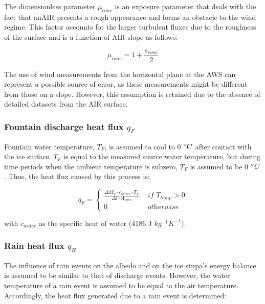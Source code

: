 The dimensionless parameter $\mu_{cone}$ is an exposure parameter that deals with the fact that an\ac{AIR} presents a rough
appearance and forms an obstacle to the wind regime. This factor accounts for the larger turbulent fluxes due to
the roughness of the surface \citep{oerlemansBriefCommunicationGrowth2021} and is a function of \ac{AIR} slope
as follows:

\begin{equation}
	\mu_{cone} = 1 + \frac{s_{cone}}{2}
	\label{eqn:mu}
\end{equation}

The use of wind measurements from the horizontal plane at the \ac{AWS} can represent a possible source of error,
as these measurements might be different from those on a slope. However, this assumption is retained due to the absence of detailed datasets from the \ac{AIR} surface.

\subsubsection{Fountain discharge heat flux \texorpdfstring{$q_{F}$}{Lg} } \label{sec:heatflux}

Fountain water temperature, $T_F$, is assumed to cool to 0 $^{\circ} C$ after contact with the ice surface.
$T_F$ is equal to the measured source water temperature, but during time periods when the ambient temperature is
subzero, $T_F$ is assumed to be 0 $^{\circ} C$. Thus, the heat flux caused by this process is:

\begin{equation}
	q_{F} = \left\{ \begin{array}{ll}
		\frac{ \Delta M_F \cdot c_{water} \cdot T_F}{\Delta t \cdot A_{cone}} & \textit{ if } T_{temp} > 0 \\
		0                                                                     & \textit{ otherwise}
	\end{array} \right.
\end{equation}

with $c_{water}$ as the specific heat of water (4186 J $kg^{-1} K^{-1}$).

\subsubsection{Rain heat flux \texorpdfstring{$q_{R}$}{Lg} }

The influence of rain events on the albedo and on the ice stupa's energy balance is assumed to be similar to that of discharge
events. However, the water temperature of a rain event is assumed to be equal to the air temperature. Accordingly,
the heat flux generated due to a rain event is determined:


